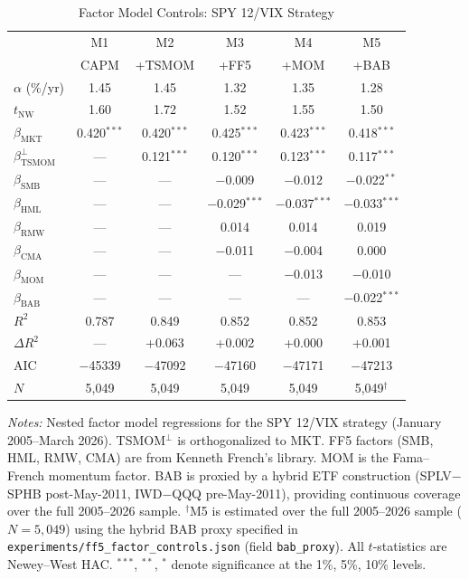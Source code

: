 \documentclass[12pt,a4paper]{article}
\begin{document}
\begin{table}[H]
\centering
\begin{threeparttable}
\caption{Factor Model Controls: SPY 12/VIX Strategy}
\label{tab:ff5}
\small
\begin{tabular}{@{}lccccc@{}}
\toprule
& M1 & M2 & M3 & M4 & M5 \\
& CAPM & +TSMOM & +FF5 & +MOM & +BAB \\
\midrule
$\alpha$ (\%/yr) & 1.45 & 1.45 & 1.32 & 1.35 & 1.28 \\
$t_{\text{NW}}$  & 1.60 & 1.72 & 1.52 & 1.55 & 1.50 \\
\midrule
$\beta_{\text{MKT}}$ & 0.420$^{***}$ & 0.420$^{***}$ & 0.425$^{***}$ & 0.423$^{***}$ & 0.418$^{***}$ \\
$\beta_{\text{TSMOM}}^{\perp}$ & --- & 0.121$^{***}$ & 0.120$^{***}$ & 0.123$^{***}$ & 0.117$^{***}$ \\
$\beta_{\text{SMB}}$ & --- & --- & $-$0.009 & $-$0.012 & $-$0.022$^{**}$ \\
$\beta_{\text{HML}}$ & --- & --- & $-$0.029$^{***}$ & $-$0.037$^{***}$ & $-$0.033$^{***}$ \\
$\beta_{\text{RMW}}$ & --- & --- & 0.014 & 0.014 & 0.019 \\
$\beta_{\text{CMA}}$ & --- & --- & $-$0.011 & $-$0.004 & 0.000 \\
$\beta_{\text{MOM}}$ & --- & --- & --- & $-$0.013 & $-$0.010 \\
$\beta_{\text{BAB}}$ & --- & --- & --- & --- & $-$0.022$^{***}$ \\
\midrule
$R^2$    & 0.787 & 0.849 & 0.852 & 0.852 & 0.853 \\
$\Delta R^2$ & --- & +0.063 & +0.002 & +0.000 & +0.001 \\
AIC     & $-$45339 & $-$47092 & $-$47160 & $-$47171 & $-$47213 \\
$N$     & 5,049 & 5,049 & 5,049 & 5,049 & 5,049$^{\dagger}$ \\
\bottomrule
\end{tabular}
\begin{tablenotes}
\small
\item \textit{Notes:} Nested factor model regressions for the SPY 12/VIX strategy (January 2005--March 2026). TSMOM$^{\perp}$ is orthogonalized to MKT. FF5 factors (SMB, HML, RMW, CMA) are from Kenneth French's library. MOM is the Fama--French momentum factor. BAB is proxied by a hybrid ETF construction (SPLV$-$SPHB post-May-2011, IWD$-$QQQ pre-May-2011), providing continuous coverage over the full 2005--2026 sample. $^{\dagger}$M5 is estimated over the full 2005--2026 sample ($N = 5{,}049$) using the hybrid BAB proxy specified in \texttt{experiments/ff5\_factor\_controls.json} (field \texttt{bab\_proxy}). All $t$-statistics are Newey--West HAC. $^{***}$, $^{**}$, $^{*}$ denote significance at the 1\%, 5\%, 10\% levels.
\end{tablenotes}
\end{threeparttable}
\end{table}
\end{document}
